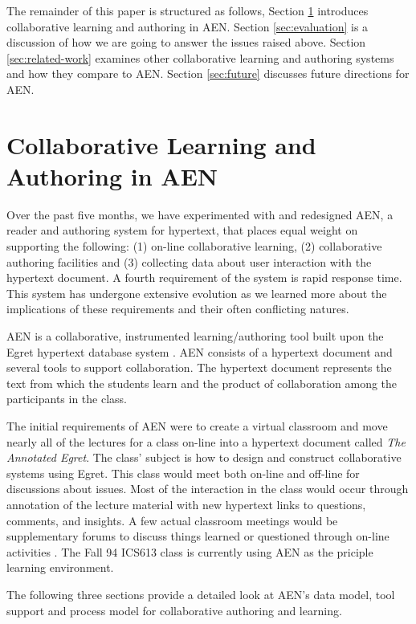 The remainder of this paper is structured as follows, Section
\ref{sec:collaborative-l} introduces collaborative learning and authoring
in AEN. Section \ref{sec:evaluation} is a discussion of how we are going to
answer the issues raised above.  Section \ref{sec:related-work} examines
other collaborative learning and authoring systems and how they compare to
AEN. Section \ref{sec:future} discusses future directions for AEN.


\section{Collaborative Learning and Authoring in AEN}
\label{sec:collaborative-l}
Over the past five months, we have experimented with and redesigned AEN, a
reader and authoring system for hypertext, that places equal weight on
supporting the following: (1) on-line collaborative learning, (2)
collaborative authoring facilities and (3) collecting data about user
interaction with the hypertext document.  A fourth requirement of the
system is rapid response time. This system has undergone extensive
evolution as we learned more about the implications of these requirements
and their often conflicting natures.

AEN is a collaborative, instrumented learning/authoring tool built upon the
Egret hypertext database system \cite{csdl-93-09}.  AEN consists of a
hypertext document and several tools to support collaboration.  The
hypertext document represents the text from which the students learn and
the product of collaboration among the participants in the class.

The initial requirements of AEN were to create a virtual classroom and move
nearly all of the lectures for a class on-line into a hypertext document
called {\em The Annotated Egret}.  The class' subject is how to design and
construct collaborative systems using Egret.  This class would meet both
on-line and off-line for discussions about issues.  Most of the interaction
in the class would occur through annotation of the lecture material with
new hypertext links to questions, comments, and insights.  A few actual
classroom meetings would be supplementary forums to discuss things learned
or questioned through on-line activities \cite{John94}.  The Fall 94 ICS613
class is currently using AEN as the priciple learning environment.

The following three sections provide a detailed look at AEN's data model,
tool support and process model for collaborative authoring and learning.

